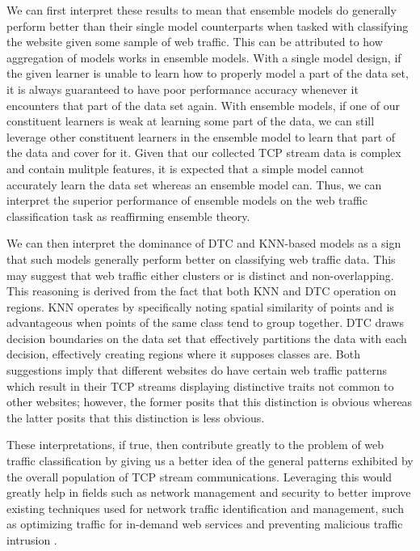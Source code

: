 \documentclass[10pt,sigconf,letterpaper,nonacm]{acmart}
\begin{document}
We can first interpret these results to mean that ensemble models do generally perform better than their single model counterparts when tasked with classifying the website given some sample of web traffic.
This can be attributed to how aggregation of models works in ensemble models.
With a single model design, if the given learner is unable to learn how to properly model a part of the data set, it is always guaranteed to have poor performance accuracy whenever it encounters that part of the data set again.
With ensemble models, if one of our constituent learners is weak at learning some part of the data, we can still leverage other constituent learners in the ensemble model to learn that part of the data and cover for it.
Given that our collected TCP stream data is complex and contain mulitple features, it is expected that a simple model cannot accurately learn the data set whereas an ensemble model can.
Thus, we can interpret the superior performance of ensemble models on the web traffic classification task as reaffirming ensemble theory.

We can then interpret the dominance of DTC and KNN-based models as a sign that such models generally perform better on classifying web traffic data.
This may suggest that web traffic either clusters or is distinct and non-overlapping.
This reasoning is derived from the fact that both KNN and DTC operation on regions.
KNN operates by specifically noting spatial similarity of points and is advantageous when points of the same class tend to group together.
DTC draws decision boundaries on the data set that effectively partitions the data with each decision, effectively creating regions where it supposes classes are.
Both suggestions imply that different websites do have certain web traffic patterns which result in their TCP streams displaying distinctive traits not common to other websites; however, the former posits that this distinction is obvious whereas the latter posits that this distinction is less obvious.

These interpretations, if true, then contribute greatly to the problem of web traffic classification by giving us a better idea of the general patterns exhibited by the overall population of TCP stream communications.
Leveraging this would greatly help in fields such as network management and security to better improve existing techniques used for network traffic identification and management, such as optimizing traffic for in-demand web services and preventing malicious traffic intrusion \cite{traffic}.
\end{document}
